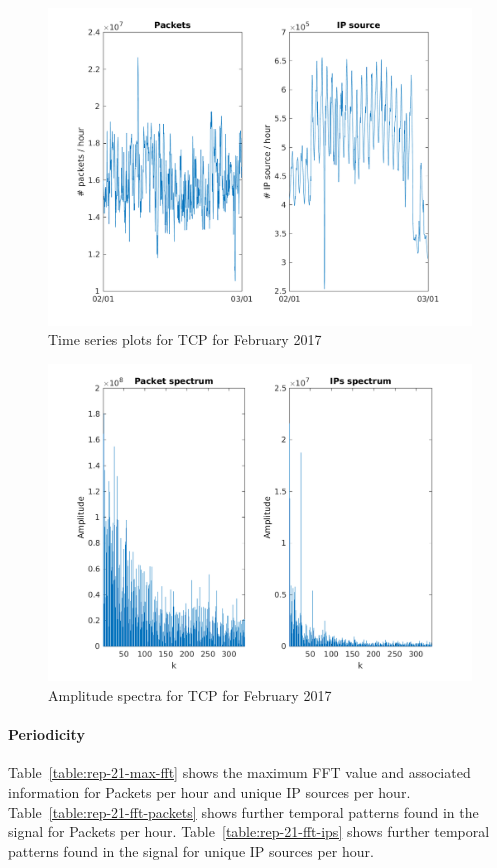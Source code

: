 \documentclass{article}
\begin{document}
\begin{figure}[h]
    \centering
    \includegraphics[width=\textwidth]{../exercise-3/plots/rep_21_a}
    \caption{\label{figure:rep-21-timeseries} Time series plots for TCP for February 2017}
\end{figure}

\begin{figure}[h]
    \centering
    \includegraphics[width=\textwidth]{../exercise-3/plots/rep_21_b}
    \caption{\label{figure:rep-21-fft} Amplitude spectra for TCP for February 2017}
\end{figure}

\paragraph{Periodicity}
Table~\ref{table:rep-21-max-fft} shows the maximum FFT value and associated information for Packets
per hour and unique IP sources per hour.
Table~\ref{table:rep-21-fft-packets} shows further temporal patterns found in the signal for Packets
per hour.
Table~\ref{table:rep-21-fft-ips} shows further temporal patterns found in the signal for unique IP
sources per hour.
\end{document}
